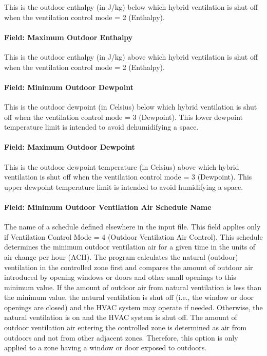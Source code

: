 This is the outdoor enthalpy (in J/kg) below which hybrid ventilation is shut off when the ventilation control mode = 2 (Enthalpy).

\paragraph{Field: Maximum Outdoor Enthalpy}\label{field-maximum-outdoor-enthalpy}

This is the outdoor enthalpy (in J/kg) above which hybrid ventilation is shut off when the ventilation control mode = 2 (Enthalpy).

\paragraph{Field: Minimum Outdoor Dewpoint}\label{field-minimum-outdoor-dewpoint}

This is the outdoor dewpoint (in Celsius) below which hybrid ventilation is shut off when the ventilation control mode = 3 (Dewpoint). This lower dewpoint temperature limit is intended to avoid dehumidifying a space.

\paragraph{Field: Maximum Outdoor Dewpoint}\label{field-maximum-outdoor-dewpoint}

This is the outdoor dewpoint temperature (in Celsius) above which hybrid ventilation is shut off when the ventilation control mode = 3 (Dewpoint). This upper dewpoint temperature limit is intended to avoid humidifying a space.

\paragraph{Field: Minimum Outdoor Ventilation Air Schedule Name}\label{field-minimum-outdoor-ventilation-air-schedule-name}

The name of a schedule defined elsewhere in the input file. This field applies only if Ventilation Control Mode = 4 (Outdoor Ventilation Air Control). This schedule determines the minimum outdoor ventilation air for a given time in the units of air change per hour (ACH). The program calculates the natural (outdoor) ventilation in the controlled zone first and compares the amount of outdoor air introduced by opening windows or doors and other small openings to this minimum value. If the amount of outdoor air from natural ventilation is less than the minimum value, the natural ventilation is shut off (i.e., the window or door openings are closed) and the HVAC system may operate if needed. Otherwise, the natural ventilation is on and the HVAC system is shut off. The amount of outdoor ventilation air entering the controlled zone is determined as air from outdoors and not from other adjacent zones. Therefore, this option is only applied to a zone having a window or door exposed to outdoors.


